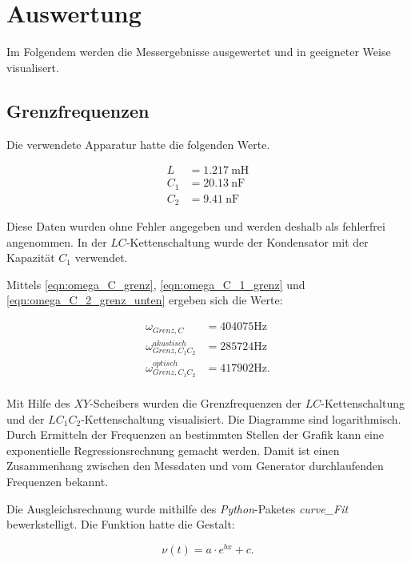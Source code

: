 %

%

\section{Auswertung}

Im Folgendem werden die Messergebnisse ausgewertet und in geeigneter
Weise visualisert.

\subsection{Grenzfrequenzen}

Die verwendete Apparatur hatte die folgenden Werte.

\begin{align}
  \label{L}
  L &= \SI{1,217}{\milli\henry}\\
  \label{C1}
  C_1 &= \SI{20,13}{\nano\farad}\\
  \label{C2}
  C_2 &= \SI{9,41}{\nano\farad}
\end{align}

Diese Daten wurden ohne Fehler angegeben und werden deshalb als fehlerfrei
angenommen. In der $LC$-Kettenschaltung wurde der Kondensator mit der
Kapazität $C_1$ verwendet.

Mittels \eqref{eqn:omega_C_grenz}, \eqref{eqn:omega_C_1_grenz} und
\eqref{eqn:omega_C_2_grenz_unten} ergeben sich die Werte:

\begin{align*}
  \omega_{Grenz,C} &= \num{404075}\si{\hertz}\\
  \omega_{Grenz,C_1C_2}^{akustisch} &= \num{285724}\si{\hertz}\\
  \omega_{Grenz,C_1C_2}^{optisch} &= \num{417902}\si{\hertz}.\\
\end{align*}

Mit Hilfe des $XY$-Scheibers wurden die Grenzfrequenzen der $LC$-Kettenschaltung
und der $LC_1C_2$-Kettenschaltung visualisiert. Die Diagramme sind
logarithmisch. Durch Ermitteln der Frequenzen an bestimmten Stellen der
Grafik kann eine exponentielle Regressionsrechnung gemacht werden.
Damit ist einen Zusammenhang zwischen den Messdaten und vom Generator durchlaufenden
Frequenzen bekannt.

Die Ausgleichsrechnung wurde mithilfe des \emph{Python}-Paketes
\emph{curve\_Fit} bewerkstelligt. Die Funktion hatte die Gestalt:

\begin{equation}
  \nu(t) = a\cdot e^{bx}+c.
\end{equation}

